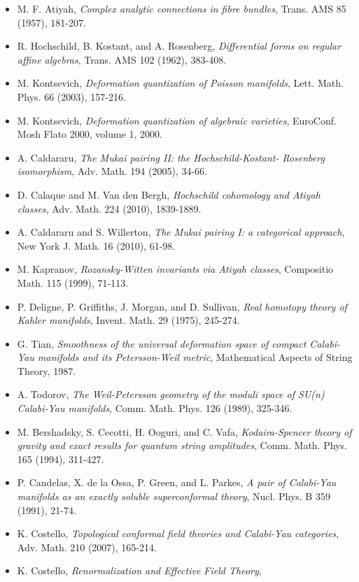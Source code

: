 \documentclass[11pt]{amsart}
\theoremstyle{definition}
\theoremstyle{remark}
\begin{document}
\begin{itemize}[leftmargin=1.2em,itemsep=2pt]
\item M. F. Atiyah, \emph{Complex analytic connections in fibre
bundles}, Trans. AMS 85 (1957), 181-207.
\item R. Hochschild, B. Kostant, and A. Rosenberg,
\emph{Differential forms on regular affine algebras}, Trans. AMS 102
(1962), 383-408.
\item M. Kontsevich, \emph{Deformation quantization of Poisson
manifolds}, Lett. Math. Phys. 66 (2003), 157-216.
\item M. Kontsevich, \emph{Deformation quantization of algebraic
varieties}, EuroConf. Mosh Flato 2000, volume 1, 2000.
\item A. Caldararu, \emph{The Mukai pairing II: the Hochschild-Kostant-
Rosenberg isomorphism}, Adv. Math. 194 (2005), 34-66.
\item D. Calaque and M. Van den Bergh, \emph{Hochschild cohomology and
Atiyah classes}, Adv. Math. 224 (2010), 1839-1889.
\item A. Caldararu and S. Willerton, \emph{The Mukai pairing I: a
categorical approach}, New York J. Math. 16 (2010), 61-98.
\item M. Kapranov, \emph{Rozansky-Witten invariants via Atiyah
classes}, Compositio Math. 115 (1999), 71-113.
\item P. Deligne, P. Griffiths, J. Morgan, and D. Sullivan,
\emph{Real homotopy theory of Kahler manifolds}, Invent. Math. 29
(1975), 245-274.
\item G. Tian, \emph{Smoothness of the universal deformation space of
compact Calabi-Yau manifolds and its Petersson-Weil metric},
Mathematical Aspects of String Theory, 1987.
\item A. Todorov, \emph{The Weil-Petersson geometry of the moduli space
of SU(n) Calabi-Yau manifolds}, Comm. Math. Phys. 126 (1989), 325-346.
\item M. Bershadsky, S. Cecotti, H. Ooguri, and C. Vafa,
\emph{Kodaira-Spencer theory of gravity and exact results for quantum
string amplitudes}, Comm. Math. Phys. 165 (1994), 311-427.
\item P. Candelas, X. de la Ossa, P. Green, and L. Parkes,
\emph{A pair of Calabi-Yau manifolds as an exactly soluble
superconformal theory}, Nucl. Phys. B 359 (1991), 21-74.
\item K. Costello, \emph{Topological conformal field theories and
Calabi-Yau categories}, Adv. Math. 210 (2007), 165-214.
\item K. Costello, \emph{Renormalization and Effective Field Theory},

\end{itemize}
\end{document}
